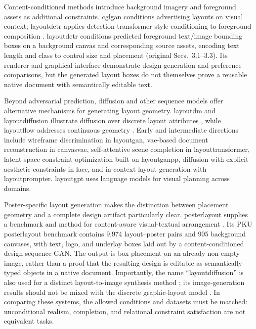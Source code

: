Content-conditioned methods introduce background imagery and foreground assets as additional constraints.
\ac{cglgan} conditions advertising layouts on visual context; \ac{layoutdetr} applies detection-transformer-style conditioning to foreground composition \citep{layoutdetr2024}.
\ac{layoutdetr} conditions predicted foreground text/image bounding boxes on a background canvas and corresponding source assets, encoding text length and class to control size and placement (original Secs.~3.1--3.3).
Its renderer and graphical interface demonstrate design generation and preference comparisons, but the generated layout boxes do not themselves prove a reusable native document with semantically editable text.

Beyond adversarial prediction, diffusion and other sequence models offer alternative mechanisms for generating layout geometry.
\ac{layoutdm} and \ac{layoutdiffusion} illustrate diffusion over discrete layout attributes \citep{layoutdm2023}, while \ac{layoutflow} addresses continuous geometry \citep{layoutflow2024}.
Early and intermediate directions include wireframe discrimination in \ac{layoutgan}, \ac{vae}-based document reconstruction in \ac{canvasvae}, self-attentive scene completion in \ac{layouttransformer}, latent-space constraint optimization built on \ac{layoutganpp}, diffusion with explicit aesthetic constraints in \ac{lace}, and in-context layout generation with \ac{layoutprompter}.
\ac{layoutgpt} uses language models for visual planning across domains.

Poster-specific layout generation makes the distinction between placement geometry and a complete design artifact particularly clear.
\ac{posterlayout} supplies a benchmark and method for content-aware visual-textual arrangement \citep{posterlayout2023}.
Its PKU \ac{posterlayout} benchmark contains 9,974 layout--poster pairs and 905 background canvases, with text, logo, and underlay boxes laid out by a content-conditioned design-sequence GAN.
The output is box placement on an already non-empty image, rather than a proof that the resulting design is editable as semantically typed objects in a native document.
Importantly, the name ``\ac{layoutdiffusion}'' is also used for a distinct layout-to-image synthesis method \citep{layoutdiffusion_l2i2023}; its image-generation results should not be mixed with the discrete graphic-layout model \citep{layoutdiffusion2023}.
In comparing these systems, the allowed conditions and datasets must be matched: unconditional realism, completion, and relational constraint satisfaction are not equivalent tasks.


